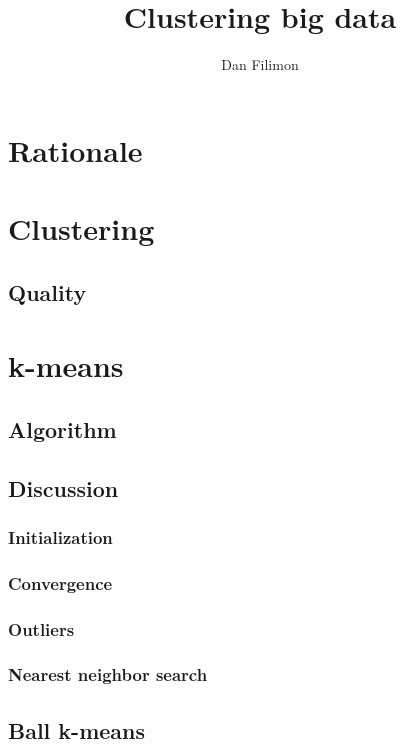 \documentclass{article}
\title{Clustering big data}
\author{Dan Filimon}
\begin{document}
\maketitle

\tableofcontents

\section{Rationale}

\section{Clustering}

\subsection{Quality}

\section{k-means}

\subsection{Algorithm}

\subsection{Discussion}

\subsubsection{Initialization}

\subsubsection{Convergence}

\subsubsection{Outliers}

\subsubsection{Nearest neighbor search}

\subsection{Ball k-means}
\end{document}
